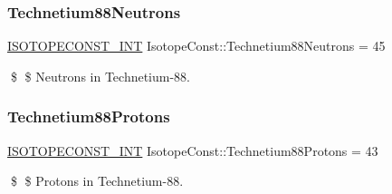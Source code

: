 \subsubsection{\texorpdfstring{Technetium88\+Neutrons}{Technetium88Neutrons}}
{\footnotesize\ttfamily \mbox{\hyperlink{group___isotope_const-_macros_ga5f18360b3e99483a35c32d789e62621c}{I\+S\+O\+T\+O\+P\+E\+C\+O\+N\+S\+T\+\_\+\+I\+NT}} Isotope\+Const\+::\+Technetium88\+Neutrons = 45}

\$ \$ Neutrons in Technetium-\/88. \mbox{\label{group___isotope_const-_technetium-_tc88_gafb06be1e7e7d25a4d35245c4821d807a}} 
\subsubsection{\texorpdfstring{Technetium88\+Protons}{Technetium88Protons}}
{\footnotesize\ttfamily \mbox{\hyperlink{group___isotope_const-_macros_ga5f18360b3e99483a35c32d789e62621c}{I\+S\+O\+T\+O\+P\+E\+C\+O\+N\+S\+T\+\_\+\+I\+NT}} Isotope\+Const\+::\+Technetium88\+Protons = 43}

\$ \$ Protons in Technetium-\/88. 